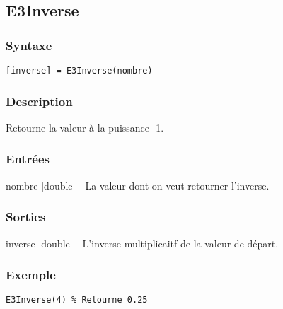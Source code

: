 \begin{minipage}{\linewidth}
\subsection*{E3Inverse}
\subsubsection*{Syntaxe}
\begin{lstlisting}
[inverse] = E3Inverse(nombre)
\end{lstlisting}
\subsubsection*{Description}
Retourne la valeur à la puissance -1.
\subsubsection*{Entrées}
\begin{description}
\item nombre [double] - La valeur dont on veut retourner l'inverse. 
\end{description} \subsubsection*{Sorties}
\begin{description}
\item inverse [double] - L'inverse multiplicaitf de la valeur de départ. 
\end{description} 
\subsubsection*{Exemple}
\begin{lstlisting}
E3Inverse(4) % Retourne 0.25
\end{lstlisting} \medskip
\end{minipage}